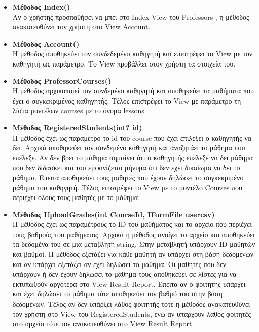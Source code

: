 \documentclass[12pt]{article}
\begin{document}
	
	\begin{itemize}
		
		\item \textbf{Μέθοδος Index()}\\
		Αν ο χρήστης προσπαθήσει να μπει στο Index View του Professors , η μέθοδος ανακατευθύνει τον χρήστη στο View Account.		
		
		\item \textbf{Μέθοδος Account()}\\
		Η μέθοδος αποθηκεύει τον συνδεδεμένο καθηγητή και επιστρέφει το View με τον καθηγητή ως παράμετρο. Το View προβάλλει στον χρήστη τα στοιχεία του.		
		
		\item \textbf{Μέθοδος ProfessorCourses()}\\
		Η μέθοδος αρχικοποιεί τον συνδεμένο καθηγητή και αποθηκεύει τα μαθήματα που έχει ο συγκεκριμένος καθηγητής. Τέλος επιστρέφει το View με παράμετρο τη λίστα μοντέλων courses με το όνομα lessons.		
		
		\item \textbf{Μέθοδος RegisteredStudents(int? id)}\\
		Η μέθοδος έχει ως παράμετρο το id του course που έχει επιλέξει ο καθηγητής να δει. Αρχικά αποθηκεύει τον συνδεμένο καθηγητή και αναζητάει το μάθημα που επέλεξε. Αν δεν βρει το μάθημα σημαίνει ότι ο καθηγητής επέλεξε να δει μάθημα που δεν διδάσκει και του εμφανίζεται μήνυμα ότι δεν έχει δικαίωμα να δει το μάθημα. Έπειτα αποθηκεύει τους μαθητές που έχουν δηλώσει το συγκεκριμένο μάθημα του καθηγητή. Τέλος επιστρέφει το View με το  μοντέλο Courses που περιέχει όλους τους μαθητές με το μάθημα.

		\item \textbf{Μέθοδος UploadGrades(int CourseId, IFormFile usercsv)}\\
		Η μέθοδος έχει ως παραμέτρους το ID του μαθήματος και το αρχείο που περιέχει τους βαθμούς του μαθήματος. Αρχικά η μέθοδος ανοίγει το αρχείο και αποθηκεύει  τα δεδομένα του σε μια μεταβλητή string. Στην μεταβλητή υπάρχουν ID μαθητών και βαθμοί. Η μέθοδος εξετάζει για κάθε μαθητή αν υπάρχει στη βάση δεδομένων και αν υπάρχει εξετάζει αν έχει δηλώσει το μάθημα. Οι μαθητές που δεν υπάρχουν ή δεν έχουν δηλώσει το μάθημα τους αποθηκεύει σε λίστες για να εκτυπωθούν αργότερα στο View Result Report. Έπειτα αν ο φοιτητής υπάρχει και έχει δηλώσει το μάθημα τότε αποθηκεύει τον βαθμό του στην βάση δεδομένων. Τέλος αν δεν υπάρξει λάθος φοιτητής τότε η μέθοδος ανακατευθύνει τον χρήστη στο View του RegisteredStudents, ενώ αν υπάρχουν λάθος φοιτητές στο αρχείο τότε τον ανακατευθύνει στο View Result Report.


\end{itemize}
\end{document}
